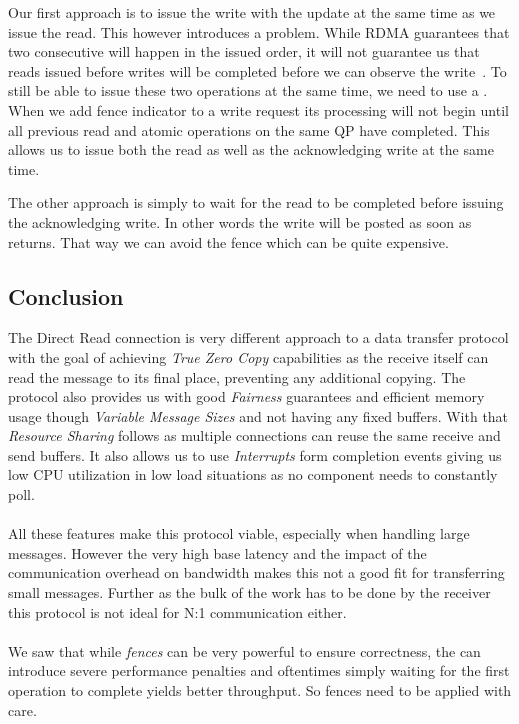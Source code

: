 Our first approach is to issue the write with the update at the same time as we issue the read. This however introduces a 
problem. While RDMA guarantees that two consecutive will happen in the issued order, it will not guarantee us that reads issued
before writes will be completed before we can observe the write~\cite{}.  To still be able to issue these two operations at the same time, we need to use a . When we add 
fence indicator to a write request its processing will not begin until all previous read and atomic operations on the same QP 
have completed. This allows us to issue both the read as well as the acknowledging write at the same time.

The other approach is simply to wait for the read to be completed before issuing the acknowledging write. In other words the
write will be posted as soon as  returns. That way we can avoid the fence which can be quite expensive.

\subsection{Conclusion}

The Direct Read connection is very different approach to a data transfer protocol with the goal of achieving 
\emph{True Zero Copy} capabilities as the receive itself can read the message to its final place, preventing any additional 
copying. The protocol also provides us with good \emph{Fairness} guarantees and efficient memory usage though 
\emph{Variable Message Sizes} and not having any fixed buffers. With that \emph{Resource Sharing} follows as multiple
connections can reuse the same receive and send buffers. It also allows us to use \emph{Interrupts} form completion events
giving us low CPU utilization in low load situations as no component needs to constantly poll.

\paragraph{} All these features make this protocol viable, especially when handling large messages. However the very high
base latency and the impact of the communication overhead on bandwidth makes this not a good fit for transferring small 
messages. Further as the bulk of the work has to be done by the receiver this protocol is not ideal for N:1 communication
either.

\paragraph{} We saw that while \emph{fences} can be very powerful to ensure correctness, the can introduce severe performance
penalties and oftentimes simply waiting for the first operation to complete yields better throughput. So fences need to be
applied with care.

